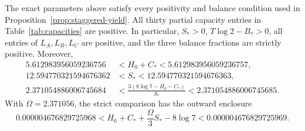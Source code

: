 \FloatBarrier
\begin{proposition}\label{prop:numerical-certificate}
The exact parameters above satisfy every positivity and balance condition
used in Proposition~\ref{prop:staggered-yield}. All thirty partial capacity
entries in Table~\ref{tab:capacities} are positive. In particular, $S_*>0$,
$T\log2-B_*>0$, all entries of $L_A,L_B,L_C$ are positive, and the three
balance fractions are strictly positive. Moreover,
\begin{align}
 5.612983956059236756&<H_0+C_*<5.612983956059236757,\label{eq:yield-certificate}\\
 12.594770321594676362&<S_*<12.594770321594676363,\label{eq:volume-certificate}\\
 2.371054886006745684
 &<\frac{3(8\log7-H_0-C_*)}{S_*}
       <2.371054886006745685.\label{eq:ratio-certificate}
\end{align}
With $\Omega=2.371056$, the strict comparison has the outward enclosure
\begin{equation}\label{eq:gap-certificate}
 0.000004676829725968
 < H_0+C_*+\frac{\Omega}{3}S_*-8\log7
 <0.000004676829725969.
\end{equation}
\end{proposition}

